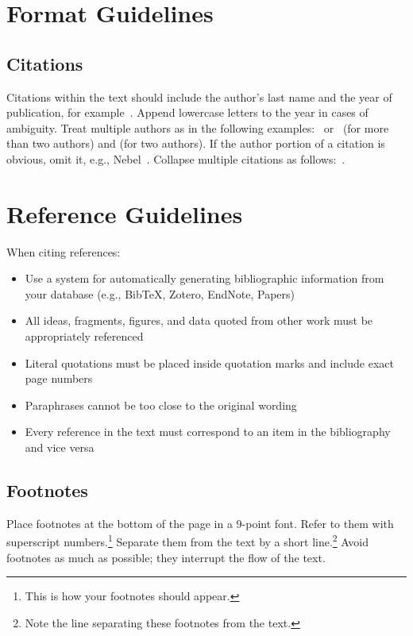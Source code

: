 \appendix

\section{Format Guidelines}

\subsection{Citations}
Citations within the text should include the author's last name and the year of publication, for example~\cite{example4}. Append lowercase letters to the year in cases of ambiguity. Treat multiple authors as in the following examples:~\cite{example1} or~\cite{example2} (for more than two authors) and \cite{example3} (for two authors). If the author portion of a citation is obvious, omit it, e.g., Nebel~. Collapse multiple citations as follows:~\cite{example5,example6}.

\section{Reference Guidelines}
When citing references:
\begin{itemize}
\item Use a system for automatically generating bibliographic information from your database (e.g., BibTeX, Zotero, EndNote, Papers)
\item All ideas, fragments, figures, and data quoted from other work must be appropriately referenced
\item Literal quotations must be placed inside quotation marks and include exact page numbers
\item Paraphrases cannot be too close to the original wording
\item Every reference in the text must correspond to an item in the bibliography and vice versa
\end{itemize}

\subsection{Footnotes}
Place footnotes at the bottom of the page in a 9-point font. Refer to
them with superscript numbers.\footnote{This is how your footnotes
should appear.} Separate them from the text by a short
line.\footnote{Note the line separating these footnotes from the
text.} Avoid footnotes as much as possible; they interrupt the flow of
the text.

